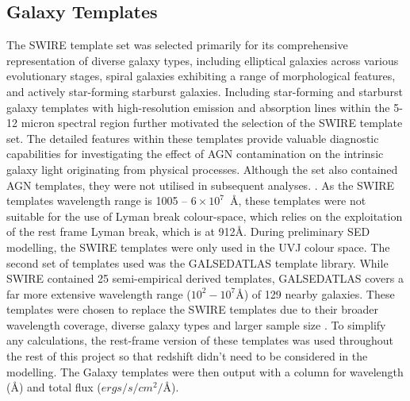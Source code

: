 \subsection{Galaxy Templates}
The SWIRE template set was selected primarily for its comprehensive representation of diverse galaxy types, including elliptical galaxies across various evolutionary stages, spiral galaxies exhibiting a range of morphological features, and actively star-forming starburst galaxies. Including star-forming and starburst galaxy templates with high-resolution emission and absorption lines within the 5-12 micron spectral region further motivated the selection of the SWIRE template set. The detailed features within these templates provide valuable diagnostic capabilities for investigating the effect of AGN contamination on the intrinsic galaxy light originating from physical processes. Although the set also contained AGN templates, they were not utilised in subsequent analyses. \citep{polletta_spectral_2007}. As the SWIRE templates wavelength range is 1005 -- $6 \times 10^7$~\AA, these templates were not suitable for the use of Lyman break colour-space, which relies on the exploitation of the rest frame Lyman break, which is at 912{\AA}. During preliminary SED modelling, the SWIRE templates were only used in the UVJ colour space. The second set of templates used was the GALSEDATLAS template library. While SWIRE contained 25 semi-empirical derived templates, GALSEDATLAS covers a far more extensive wavelength range ($10^2 -$$10^7${\AA}) of 129 nearby galaxies. These templates were chosen to replace the SWIRE templates due to their broader wavelength coverage, diverse galaxy types and larger sample size \citep{brown_atlas_2014}. To simplify any calculations, the rest-frame version of these templates was used throughout the rest of this project so that redshift didn't need to be considered in the modelling. The Galaxy templates were then output with a column for wavelength ({\AA}) and total flux ($ergs\slash s\slash cm^{2}\slash ${\AA}). 
